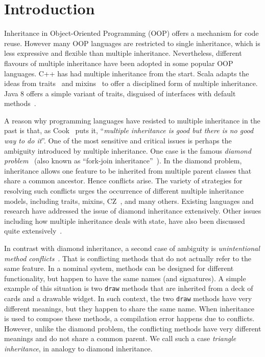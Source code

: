\section{Introduction}
Inheritance in Object-Oriented Programming (OOP) offers a mechanism
for code reuse. However many OOP languages are restricted to single
inheritance, which is less expressive and flexible than multiple
inheritance. Nevertheless, different flavours of multiple inheritance
have been adopted in some popular OOP languages. C++ has had 
multiple inheritance from the start. Scala adapts the ideas from traits~\cite{scharli03traits} 
and mixins~\cite{bracha90mixin} to offer a disciplined form of multiple inheritance. Java 8 
offers a simple variant of traits, disguised of interfaces with default methods~\cite{goetz12fdefenders}.

A reason why programming languages have resisted to multiple
inheritance in the past is that, as Cook~\cite{Cook1987} puts it, 
``\emph{multiple inheritance is good but there is no good way to do it}''.
One of the most sensitive and critical issues is perhaps the ambiguity
introduced by multiple inheritance. One case is the famous
\textit{diamond problem}~\cite{Sak89dis,Singh1995} (also known as ``fork-join inheritance''~\cite{Sak89dis}). 
In the diamond problem, inheritance allows
one feature to be inherited from multiple parent classes that share a
common ancestor. Hence
conflicts arise. The variety of strategies for resolving such conflicts
urges the occurrence of different multiple inheritance models,
including traits, mixins, CZ~\cite{malayeri2009cz}, and many others. Existing
languages and research have addressed the issue of diamond inheritance extensively. Other issues
including how multiple inheritance deals with state, 
have also been discussed quite extensively~\cite{classless,malayeri2009cz,stroustrup1995}.

In contrast with diamond inheritance, a second case of ambiguity
is \textit{unintentional method conflicts}~\cite{scharli03traits}. That is conflicting 
methods that do not actually refer to the same feature. 
In a nominal system, methods can be designed for different
functionality, but happen to have the same names (and signatures).
A simple example of this situation is two \lstinline{draw} methods that
are inherited from a deck of cards and a drawable widget. 
In such context, the two \lstinline{draw} methods have very different meanings, 
but they happen to share the same name.
When inheritance is used to compose these methods, a compilation 
error happens due to conflicts. However, unlike the diamond problem,
the conflicting methods have very different meanings and do not share a
common parent. We call such a case \textit{triangle inheritance}, in
analogy to diamond inheritance.

